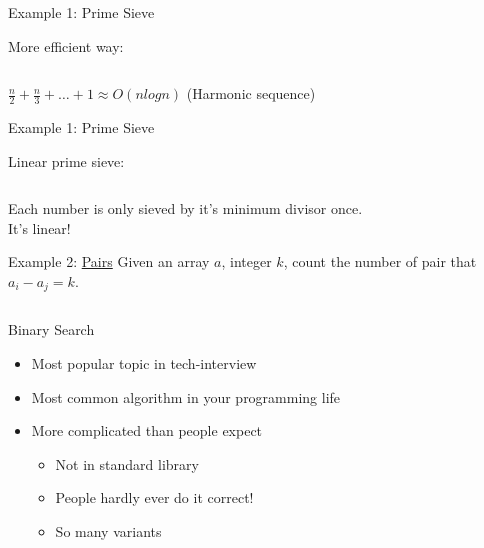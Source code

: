 \documentclass{beamer}
\begin{document}
\begin{frame}{Example 1: Prime Sieve}
   {
    \small More efficient way:
    \inputminted[linenos=true, frame=lines, fontsize=\footnotesize]{python}{./src/prime1.py}
  }
   {
    \small $\frac{n}{2} + \frac{n}{3} + \ldots + 1 \approx O(nlogn)$ (Harmonic sequence)
  }
\end{frame}

\begin{frame}{Example 1: Prime Sieve}
  \begin{minipage}{\textwidth}
   {
    \small Linear prime sieve:
    \inputminted[linenos=true, frame=lines, fontsize=\footnotesize]{python}{./src/prime2.py}
  }
  \end{minipage}

  \begin{minipage}{\textwidth}
    \vspace{2mm}
     \small Each number is only sieved by it's minimum divisor once.\\
     \small It's linear!
  \end{minipage}
\end{frame}

\begin{frame}{Example 2: \href{https://vjudge.net/contest/361685\#problem/A}{Pairs}}
 {\small Given an array $a$, integer $k$, count the number of pair that $a_i - a_j = k$.
}
 {
\inputminted[linenos=true, frame=lines, fontsize=\scriptsize]{python}{./src/pairs.py}
}
\end{frame}

\begin{frame}{Binary Search}
\begin{itemize}
  \item Most popular topic in tech-interview
  \item Most common algorithm in your programming life
  \item More complicated than people expect
  \begin{itemize}
    \item Not in standard library
    \item People hardly ever do it correct!
    \item So many variants
  \end{itemize}
\end{itemize}
\end{frame}
\end{document}
